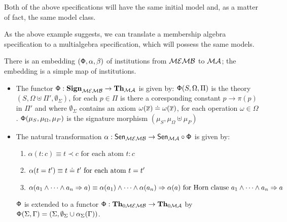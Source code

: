 \documentclass[10pt]{article}
\begin{document}
\begin{example}
Both of the above specifications will have the same initial model and, as
a matter of fact, the same model class.
\end{example}
%
As the
above example suggests, we can translate a membership algebra specification to
a multialgebra specification, which will possess the same models.

\begin{proposition}
There is an embedding $({\sf {\Phi}},\alpha, \beta)$ of institutions from ${\mathcal{MEMB}}$ 
to ${\mathcal{MA}}$; the embedding is a simple map of institutions.
\end{proposition}
%
\begin{PROOF}
	\begin{itemize}
		\item The functor ${\sf {\Phi}}: {\bf Sign}_{{\mathcal{MEMB}}} \to {\bf Th}_{{\mathcal{MA}}}$ 
is given by:  ${\sf {\Phi}}(S,\Omega,\Pi)$ is the theory $(S,\Omega \uplus \Pi', 
\emptyset_{\Sigma})$, for each $p \in \Pi$ is there a coresponding constant $p \to \pi(p)$ in $\Pi'$ and where $\emptyset_{\Sigma}$ contains an axiom 
$\omega(\overline{x}) \mathrel{\dot{=} } \omega(\overline{x})$, for each operation $\omega 
\in \Omega$. ${\sf {\Phi}}(\mu_S,\mu_{\Omega},\mu_P)$ is the signature morphism 
$(\mu_S,\mu_{\Omega} \uplus \mu_P)$
	
\item The natural transformation $\alpha: {\sf {Sen}}_{{\mathcal{MEMB}}} \to 
{\sf {Sen}}_{{\mathcal{MA}}} \circ {\sf {\Phi}}$ is given by:
	\begin{enumerate}
	\item $\alpha(t:c) \equiv t \prec c\mbox{ for each atom }t:c$
	 \item $\alpha(t=t') \equiv t \mathrel{\dot{=} } t'\mbox{ for each atom }t = t'$
	 \item $\alpha(a_1 \wedge \cdots \wedge a_n \Rightarrow 
a) \equiv \alpha(a_1) \wedge \cdots \wedge \alpha(a_n) \Rightarrow 
\alpha(a)\mbox{ for  Horn clause }a_1 \wedge \cdots \wedge a_n \Rightarrow a$
	\end{enumerate}
${\sf {\Phi}}$ is extended to a functor 
${\sf {\Phi}}: {\bf Th}_{0{\mathcal{MEMB}}} \to {\bf Th}_{0{\mathcal{MA}}}$ by 
${\sf {\Phi}}(\Sigma,\Gamma) = (\Sigma,\emptyset_\Sigma\cup\alpha_\Sigma(\Gamma))$.


\end{itemize}
\end{PROOF}
\end{document}
